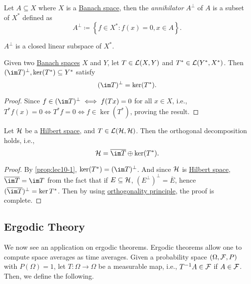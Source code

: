 \begin{definition}[Annihilator]\label{def:annihilator}
	Let \(A \subseteq X\) where \(X\) is a \hyperref[def:Banach-space]{Banach space}, then the \emph{annihilator} \(A^\perp\) of \(A\) is a subset of \(X^{\ast} \) defined as
	\[
		A^\perp \coloneqq \left\{ f\in X^{\ast} \colon f(x) = 0, x\in A \right\}.
	\]
\end{definition}

\begin{note}
	\(A^\perp\) is a closed linear subspace of \(X^{\ast} \).
\end{note}

\begin{proposition}\label{prop:lec10-1}
	Given two  \hyperref[def:Banach-space]{Banach spaces} \(X\) and \(Y\), let \(T\in \mathcal{\MakeUppercase{l}} (X, Y)\) and \(T^{\ast} \in \mathcal{\MakeUppercase{l}} (Y^{\ast} , X^{\ast} )\). Then \((\im T)^\perp, \ker (T^{\ast} ) \subseteq Y^{\ast}\) satisfy
	\[
		(\im T)^\perp = \ker (T^{\ast} ).
	\]
\end{proposition}
\begin{proof}
	Since \(f\in (\im T)^\perp \iff f(Tx)= 0\) for all \(x\in X\), i.e., \(T^{\ast} f(x) = 0 \iff T^{\ast} f = 0\iff f\in \ker(T^{\ast})\), proving the result.
\end{proof}

\begin{corollary}
	Let \(\mathcal{\MakeUppercase{h}} \) be a \hyperref[def:Hilbert-space]{Hilbert space}, and \(T\in \mathcal{\MakeUppercase{l}} (\mathcal{\MakeUppercase{h}} , \mathcal{\MakeUppercase{h}} )\). Then the orthogonal decomposition holds, i.e.,
	\[
		\mathcal{\MakeUppercase{h}} = \overline{\im T}\oplus \ker (T^{\ast} ).
	\]
\end{corollary}
\begin{proof}
	By \autoref{prop:lec10-1}, \(\ker (T^{\ast} ) = (\im T)^\perp\). And since \(\mathcal{\MakeUppercase{h}}\) is \hyperref[def:Hilbert-space]{Hilbert space}, \(\overline{\im T} = \im T\) from the fact that if \(E \subseteq \mathcal{\MakeUppercase{h}} \), \((E^\perp)^\perp = \overline{E}\), hence \((\overline{\im T})^{\perp} = \ker T^{\ast} \). Then by using \hyperref[thm:orthogonality-principle]{orthogonality principle}, the proof is complete.
\end{proof}

\subsection{Ergodic Theory}
We now see an application on ergodic theorems. Ergodic theorems allow one to compute space averages as time averages. Given a probability space \((\Omega , \mathcal{\MakeUppercase{f}} , P)\) with \(P(\Omega ) = 1\), let \(T\colon \Omega \to \Omega \) be a measurable map, i.e., \(T^{-1} A \in \mathcal{\MakeUppercase{f}} \) if \(A\in \mathcal{\MakeUppercase{f}} \). Then, we define the following.

